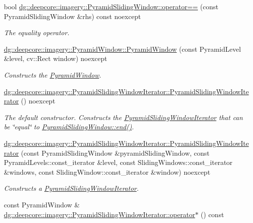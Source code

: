 \begin{DoxyCompactItemize}
bool \hyperlink{group___imagery_module_ga1b88dd8ec7d6e4c9841dfa93b64c763e}{dg\+::deepcore\+::imagery\+::\+Pyramid\+Sliding\+Window\+::operator==} (const Pyramid\+Sliding\+Window \&rhs) const noexcept
\begin{DoxyCompactList}\small\item\em The equality operator. \end{DoxyCompactList}\item 
\hyperlink{group___imagery_module_ga96c7cf53df8e5ca33d62bc9ec25215b5}{dg\+::deepcore\+::imagery\+::\+Pyramid\+Window\+::\+Pyramid\+Window} (const Pyramid\+Level \&level, cv\+::\+Rect window) noexcept
\begin{DoxyCompactList}\small\item\em Constructs the \hyperlink{structdg_1_1deepcore_1_1imagery_1_1_pyramid_window}{Pyramid\+Window}. \end{DoxyCompactList}\item 
\hyperlink{group___imagery_module_gacbd11cb149d2263770674f86d6595617}{dg\+::deepcore\+::imagery\+::\+Pyramid\+Sliding\+Window\+Iterator\+::\+Pyramid\+Sliding\+Window\+Iterator} () noexcept
\begin{DoxyCompactList}\small\item\em The default constructor. Constructs the \hyperlink{classdg_1_1deepcore_1_1imagery_1_1_pyramid_sliding_window_iterator}{Pyramid\+Sliding\+Window\+Iterator} that can be \char`\"{}equal\char`\"{} to \hyperlink{group___imagery_module_gaf39101c886a6ca5194201848f7d6d831}{Pyramid\+Sliding\+Window\+::end()}. \end{DoxyCompactList}\item 
\hyperlink{group___imagery_module_gaba595bfc1790d917eaa28c1533afa2ad}{dg\+::deepcore\+::imagery\+::\+Pyramid\+Sliding\+Window\+Iterator\+::\+Pyramid\+Sliding\+Window\+Iterator} (const Pyramid\+Sliding\+Window \&pyramid\+Sliding\+Window, const Pyramid\+Levels\+::const\+\_\+iterator \&level, const Sliding\+Windows\+::const\+\_\+iterator \&windows, const Sliding\+Window\+::const\+\_\+iterator \&window) noexcept
\begin{DoxyCompactList}\small\item\em Constructs a \hyperlink{classdg_1_1deepcore_1_1imagery_1_1_pyramid_sliding_window_iterator}{Pyramid\+Sliding\+Window\+Iterator}. \end{DoxyCompactList}\item 
const Pyramid\+Window \& \hyperlink{group___imagery_module_gaca9c2f2b709dbe324355c544933339ee}{dg\+::deepcore\+::imagery\+::\+Pyramid\+Sliding\+Window\+Iterator\+::operator$\ast$} () const 

\end{DoxyCompactItemize}
